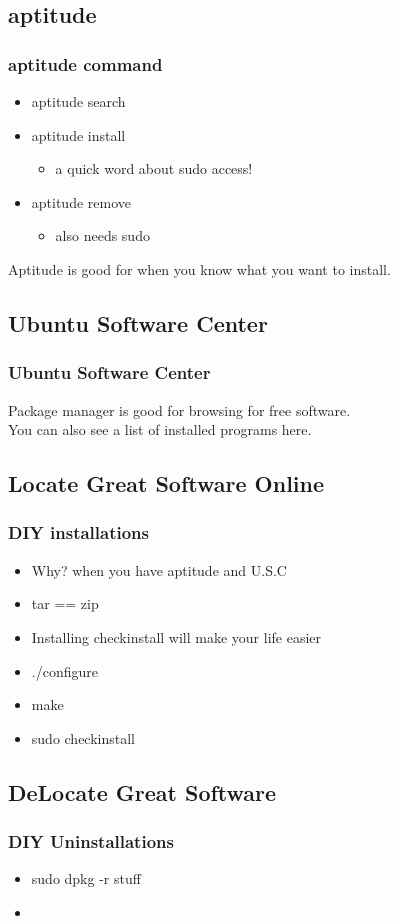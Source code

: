 \documentclass[hyperref={pdfpagelabels=false}]{beamer}
\begin{document}
\subsection{aptitude}
\frame
{
	\frametitle{aptitude command}
	\begin{itemize}
	\item{aptitude search}
	\item{aptitude install}
		\begin{itemize}
		\item{a quick word about sudo access!}
		\end{itemize}
	\item{aptitude remove}
		\begin{itemize}
		\item{also needs sudo}
		\end{itemize}
	\end{itemize}
	Aptitude is good for when you know what you want to install.	
	
}
\subsection{Ubuntu Software Center}
\frame
{
	\frametitle{Ubuntu Software Center}
	Package manager is good for browsing for free software. \\
	You can also see a list of installed programs here.

}
\subsection{Locate Great Software Online}
\frame
{	
	\frametitle{DIY installations}
	\begin{itemize}
	\item{Why? when you have aptitude and U.S.C}
	\item{tar == zip}
	\item{Installing checkinstall will make your life easier}
	\item{./configure}
	\item{make}
	\item{sudo checkinstall}
	\end{itemize}

}
\subsection{DeLocate Great Software}
\frame
{
	\frametitle{DIY Uninstallations}
	\begin{itemize}
	\item{sudo dpkg -r stuff}
	\item{}
	\end{itemize}

}
\end{document}
